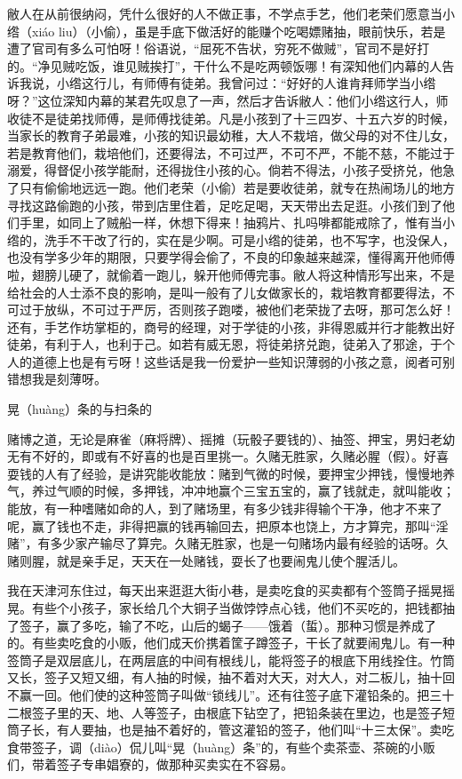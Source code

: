 \documentclass[12pt,UTF8]{ctexbook}
\begin{document}
敝人在从前很纳闷，凭什么很好的人不做正事，不学点手艺，他们老荣们愿意当小绺（xiáo liu）（小偷），虽是手底下做活好的能赚个吃喝嫖赌抽，眼前快乐，若是遭了官司有多么可怕呀！俗语说，“屈死不告状，穷死不做贼”，官司不是好打的。“净见贼吃饭，谁见贼挨打”，干什么不是吃两顿饭哪！有深知他们内幕的人告诉我说，小绺这行儿，有师傅有徒弟。我曾问过：“好好的人谁肯拜师学当小绺呀？”这位深知内幕的某君先叹息了一声，然后才告诉敝人：他们小绺这行人，师收徒不是徒弟找师傅，是师傅找徒弟。凡是小孩到了十三四岁、十五六岁的时候，当家长的教育子弟最难，小孩的知识最幼稚，大人不栽培，做父母的对不住儿女，若是教育他们，栽培他们，还要得法，不可过严，不可不严，不能不慈，不能过于溺爱，得督促小孩学能耐，还得拢住小孩的心。倘若不得法，小孩子受挤兑，他急了只有偷偷地远远一跑。他们老荣（小偷）若是要收徒弟，就专在热闹场儿的地方寻找这路偷跑的小孩，带到店里住着，足吃足喝，天天带出去足逛。小孩们到了他们手里，如同上了贼船一样，休想下得来！抽鸦片、扎吗啡都能戒除了，惟有当小绺的，洗手不干改了行的，实在是少啊。可是小绺的徒弟，也不写字，也没保人，也没有学多少年的期限，只要学得会偷了，不良的印象越来越深，懂得离开他师傅啦，翅膀儿硬了，就偷着一跑儿，躲开他师傅完事。敝人将这种情形写出来，不是给社会的人士添不良的影响，是叫一般有了儿女做家长的，栽培教育都要得法，不可过于放纵，不可过于严厉，否则孩子跑喽，被他们老荣拢了去呀，那可怎么好！还有，手艺作坊掌柜的，商号的经理，对于学徒的小孩，非得恩威并行才能教出好徒弟，有利于人，也利于己。如若有威无恩，将徒弟挤兑跑，徒弟入了邪途，于个人的道德上也是有亏呀！这些话是我一份爱护一些知识薄弱的小孩之意，阅者可别错想我是刻薄呀。





晃（huàng）条的与扫条的


赌博之道，无论是麻雀（麻将牌）、摇摊（玩骰子要钱的）、抽签、押宝，男妇老幼无有不好的，即或有不好喜的也是百里挑一。久赌无胜家，久赌必腥（假）。好喜耍钱的人有了经验，是讲究能收能放：赌到气微的时候，要押宝少押钱，慢慢地养气，养过气顺的时候，多押钱，冲冲地赢个三宝五宝的，赢了钱就走，就叫能收；能放，有一种嗜赌如命的人，到了赌场里，有多少钱非得输个干净，他才不来了呢，赢了钱也不走，非得把赢的钱再输回去，把原本也饶上，方才算完，那叫“淫赌”，有多少家产输尽了算完。久赌无胜家，也是一句赌场内最有经验的话呀。久赌则腥，就是亲手足，天天在一处赌钱，耍长了也要闹鬼儿使个腥活儿。

我在天津河东住过，每天出来逛逛大街小巷，是卖吃食的买卖都有个签筒子摇晃摇晃。有些个小孩子，家长给几个大铜子当做饽饽点心钱，他们不买吃的，把钱都抽了签子，赢了多吃，输了不吃，山后的蝎子——饿着（蜇）。那种习惯是养成了的。有些卖吃食的小贩，他们成天价携着筐子蹲签子，干长了就要闹鬼儿。有一种签筒子是双层底儿，在两层底的中间有根线儿，能将签子的根底下用线拴住。竹筒又长，签子又短又细，有人抽的时候，抽不着对大天，对大人，对二板儿，抽十回不赢一回。他们使的这种签筒子叫做“锁线儿”。还有往签子底下灌铅条的。把三十二根签子里的天、地、人等签子，由根底下钻空了，把铅条装在里边，也是签子短筒子长，有人要抽，也是抽不着好的，管这灌铅的签子，他们叫“十三太保”。卖吃食带签子，调（diào）侃儿叫“晃（huàng）条”的，有些个卖茶壶、茶碗的小贩们，带着签子专串娼寮的，做那种买卖实在不容易。
\end{document}
